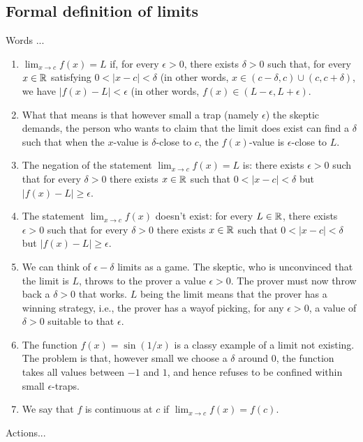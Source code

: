 \documentclass[10pt]{amsart}
\begin{document}
\subsection{Formal definition of limits}

Words ...

\begin{enumerate}
\item $\lim_{x \to c} f(x) = L$ if, for every $\epsilon > 0$, there
  exists $\delta > 0$ such that, for every $x \in \mathbb{R}$ satisfying $0 <
  |x - c| < \delta$ (in other words, $x \in (c-\delta,c) \cup
  (c,c+\delta)$, we have $|f(x) - L| < \epsilon$ (in other words,
  $f(x) \in (L - \epsilon,L+\epsilon)$.
\item What that means is that however small a trap (namely $\epsilon$)
  the skeptic demands, the person who wants to claim that the limit
  does exist can find a $\delta$ such that when the $x$-value is
  $\delta$-close to $c$, the $f(x)$-value is $\epsilon$-close to $L$.
\item The negation of the statement $\lim_{x \to c} f(x) = L$ is: there
  exists $\epsilon > 0$ such that for every $\delta > 0$ there exists
  $x \in \mathbb{R}$ such that $0 < |x - c| < \delta$ but $|f(x) - L| \ge
  \epsilon$.
\item The statement $\lim_{x \to c} f(x)$ doesn't exist: for every $L
  \in \mathbb{R}$, there exists $\epsilon > 0$ such that for every $\delta >
  0$ there exists $x \in \mathbb{R}$ such that $0 < |x - c| < \delta$ but
  $|f(x) - L| \ge \epsilon$.
\item We can think of $\epsilon-\delta$ limits as a game. The skeptic,
  who is unconvinced that the limit is $L$, throws to the prover a
  value $\epsilon > 0$. The prover must now throw back a $\delta > 0$
  that works. $L$ being the limit means that the prover has a winning
  strategy, i.e., the prover has a wayof picking, for any $\epsilon >
  0$, a value of $\delta > 0$ suitable to that $\epsilon$.
\item The function $f(x) = \sin(1/x)$ is a classy
  example of a limit not existing. The problem is that, however small
  we choose a $\delta$ around $0$, the function takes all values
  between $-1$ and $1$, and hence refuses to be confined within small
  $\epsilon$-traps.
\item We say that $f$ is continuous at $c$ if $\lim_{x \to c} f(x) =
  f(c)$.
\end{enumerate}

Actions...
\end{document}
